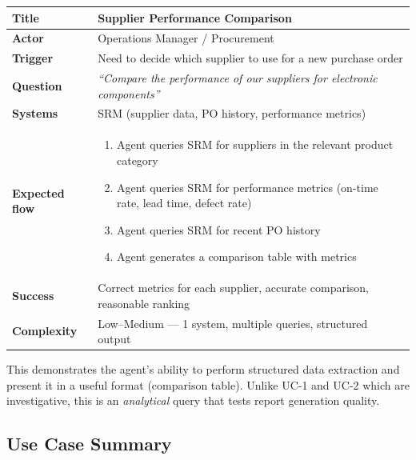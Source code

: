 \documentclass[11pt,a4paper]{article}
\begin{document}
\begin{table}[H]
\centering\small
\begin{tabularx}{\textwidth}{@{} l X @{}}
\toprule
\textbf{Title}       & Supplier Performance Comparison \\
\midrule
\textbf{Actor}       & Operations Manager / Procurement \\
\textbf{Trigger}     & Need to decide which supplier to use for a new purchase order \\
\textbf{Question}    & \textit{``Compare the performance of our suppliers for electronic components''} \\
\textbf{Systems}     & SRM (supplier data, PO history, performance metrics) \\
\textbf{Expected flow} &
    \begin{enumerate}[nosep,leftmargin=1.2em]
        \item Agent queries SRM for suppliers in the relevant product category
        \item Agent queries SRM for performance metrics (on-time rate, lead time, defect rate)
        \item Agent queries SRM for recent PO history
        \item Agent generates a comparison table with metrics
    \end{enumerate} \\
\textbf{Success}     & Correct metrics for each supplier, accurate comparison, reasonable ranking \\
\textbf{Complexity}  & Low--Medium --- 1 system, multiple queries, structured output \\
\bottomrule
\end{tabularx}
\end{table}

\begin{notebox}
This demonstrates the agent's ability to perform structured data extraction and present it in a useful format (comparison table). Unlike UC-1 and UC-2 which are investigative, this is an \textit{analytical} query that tests report generation quality.
\end{notebox}

\subsection{Use Case Summary}
\end{document}
